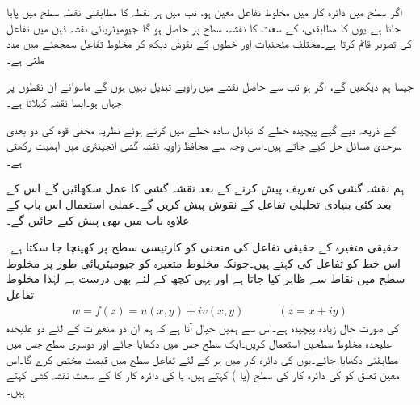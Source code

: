 اگر  سطح میں دائرہ کار  میں مخلوط تفاعل  معین ہو، تب  میں ہر نقطہ کا مطابقتی نقطہ  سطح میں پایا جاتا ہے۔یوں 
 کا مطابقتی،  کے سعت کا نقشہ،  سطح پر حاصل ہو گا۔جیومیٹریائی نقشہ ذہن میں تفاعل کی تصویر قائم کرتا ہے۔مختلف منحنیات اور خطوں کے نقوش دیکھ کر مخلوط تفاعل سمجھنے میں مدد ملتی ہے۔

جیسا ہم دیکھیں گے، اگر   ہو تب  سے حاصل نقشے میں زاویے تبدیل نہیں ہوں گے ماسوائے ان نقطوں پر جہاں  ہو۔ایسا نقشہ  کہلاتا ہے۔ 

 کے ذریعہ دیے گیے پیچیدہ خطے کا تبادل سادہ خطے میں کرتے ہوئے نظریہ مخفی قوہ کی دو بعدی سرحدی مسائل حل کیے جاتے ہیں۔اسی وجہ سے محافظ زاویہ نقشہ گشی انجینئری میں اہمیت رکھتی ہے۔

ہم نقشہ گشی کی تعریف پیش کرنے کے بعد نقشہ گشی کا عمل سکھائیں گے۔اس کے بعد کئی بنیادی تحلیلی تفاعل  کے نقوش پیش کریں گے۔عملی استعمال اس باب کے علاوہ باب  میں بھی پیش کیے جائیں گے۔

حقیقی متغیرہ  کے حقیقی تفاعل  کی منحنی  کو کارتیسی  سطح پر  کھینچا جا سکتا ہے۔اس خط کو تفاعل کی  کہتے ہیں۔چونکہ مخلوط متغیرہ  کو جیومیٹریائی طور پر مخلوط سطح میں نقاط سے ظاہر کیا جاتا ہے اور یہی کچھ   کے لئے بھی درست ہے لہٰذا مخلوط تفاعل
\begin{align}
w=f(z)=u(x,y)+iv(x,y)\quad \quad \quad (z=x+iy)
\end{align}
کی صورت حال زیادہ پیچیدہ ہے۔اس سے ہمیں خیال آتا ہے کہ ہم ان دو متغیرات کے لئے دو علیحدہ علیحدہ مخلوط سطحیں استعمال کریں۔ایک  سطح جس میں  دکھایا جائے اور دوسری  سطح جس میں مطابقتی  دکھایا جائے۔یوں   کی دائرہ کار  میں ہر   کے لئے تفاعل   سطح    میں قیمت   مختص کرے گا۔اس معین تعلق کو  کی دائرہ کار کی سطح     (یا ) کہتے ہیں، یا  کی دائرہ کار کا  کے سعت  نقشہ کشی کہتے ہیں۔

